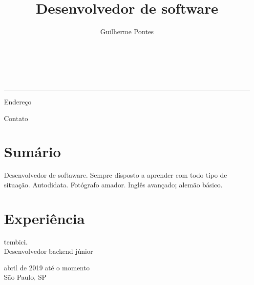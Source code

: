\documentclass{article}
\newcommand{\hr}{
    \noindent\parbox{\linewidth}{\rule[5pt]{\textwidth}{1pt}}%
}
\renewcommand{\maketitle}{
    \noindent
    {\Large\bfseries\theauthor} \\
    {\large\color{sec}{\thetitle}} \\
    \hr
}
\begin{document}
\author{Guilherme Pontes}
\title{Desenvolvedor de software}

\maketitle
\begin{multicols}{2}
    \noindent%
    \begin{flushleft}
        \noindent%
        Endereço \\
        \color{sec}{
            Rua Antônio Rosa Machado \\
            Vila Campo Grande \\
            São Paulo, SP \\
            19 anos
        }
    \end{flushleft}
    \columnbreak
    \begin{flushright}
        \noindent
        Contato \\
        \color{sec}{
            +55 11 99213-9309 \\
            pontes.guisilva@gmail.com \\
            linkedin.com/in/gpontesss \\
            github.com/gpontesss
        }
    \end{flushright}
\end{multicols}

\section{Sum\'ario}

Desenvolvedor de softaware. Sempre disposto a aprender com todo tipo de
situação. Autodidata. Fotógrafo amador. Inglês avançado; alemão básico.

\section{Experi\^{e}ncia}

\begin{multicols}{2}
    \noindent
    \begin{flushleft}
        tembici. \\
        Desenvolvedor backend júnior
    \end{flushleft}
    \columnbreak
    \begin{flushright}
        abril de 2019 até o momento \\
        São Paulo, SP
    \end{flushright}
\end{multicols}
\end{document}
